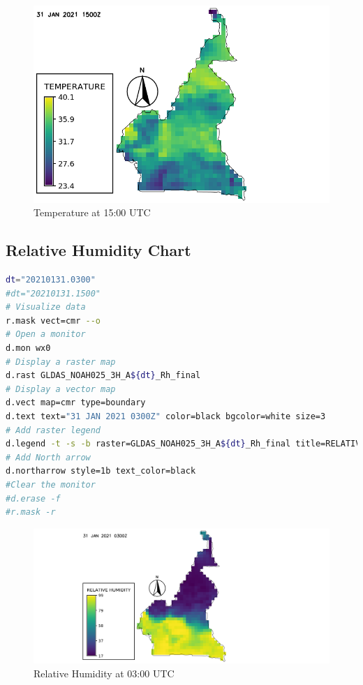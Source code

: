\begin{figure}[H]
\begin{center}
\includegraphics[scale=0.8]{tp15.png} %
\end{center}
\caption{Temperature at 15:00 UTC}
\label{Temperature at 15:00 UTC}%
\end{figure}

\subsection{Relative Humidity Chart}
\begin{lstlisting}[language=Bash]
dt="20210131.0300"
#dt="20210131.1500"
# Visualize data
r.mask vect=cmr --o
# Open a monitor
d.mon wx0
# Display a raster map
d.rast GLDAS_NOAH025_3H_A${dt}_Rh_final
# Display a vector map
d.vect map=cmr type=boundary
d.text text="31 JAN 2021 0300Z" color=black bgcolor=white size=3
# Add raster legend
d.legend -t -s -b raster=GLDAS_NOAH025_3H_A${dt}_Rh_final title=RELATIVE HUMIDITY title_fontsize=20 font=sans fontsize=18
# Add North arrow
d.northarrow style=1b text_color=black
#Clear the monitor
#d.erase -f
#r.mask -r
\end{lstlisting}

\begin{figure}[H]
\begin{center}
\includegraphics[scale=0.6]{rh03.png} %
\end{center}
\caption{Relative Humidity at 03:00 UTC}
\label{Relative Humidity at 03:00 UTC}%
\end{figure}

